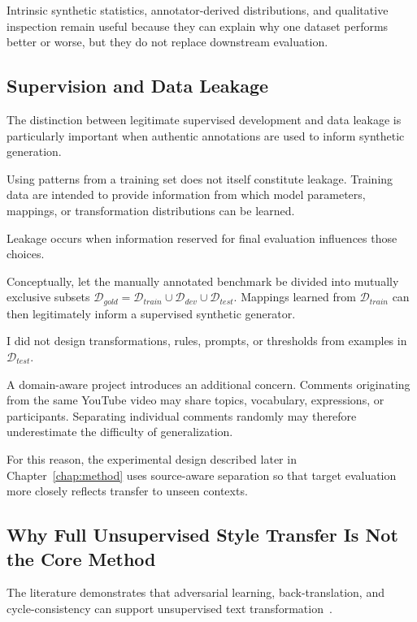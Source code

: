 \documentclass[12pt, a4paper, twoside, openany]{report}
\begin{document}
Intrinsic synthetic statistics, annotator-derived distributions, and qualitative inspection remain useful because they can explain why one dataset performs better or worse, but they do not replace downstream evaluation.


\subsection{Supervision and Data Leakage}

The distinction between legitimate supervised development and data leakage is particularly important when authentic annotations are used to inform synthetic generation.

Using patterns from a training set does not itself constitute leakage. Training data are intended to provide information from which model parameters, mappings, or transformation distributions can be learned.

Leakage occurs when information reserved for final evaluation influences those choices.

Conceptually, let the manually annotated benchmark be divided into mutually exclusive subsets $\mathcal{D}_{gold}=\mathcal{D}_{train}\cup\mathcal{D}_{dev}\cup\mathcal{D}_{test}$. Mappings learned from $\mathcal{D}_{train}$ can then legitimately inform a supervised synthetic generator.

I did not design transformations, rules, prompts, or thresholds from examples in $\mathcal{D}_{test}$.

A domain-aware project introduces an additional concern. Comments originating from the same YouTube video may share topics, vocabulary, expressions, or participants. Separating individual comments randomly may therefore underestimate the difficulty of generalization.

For this reason, the experimental design described later in Chapter~\ref{chap:method} uses source-aware separation so that target evaluation more closely reflects transfer to unseen contexts.


\subsection{Why Full Unsupervised Style Transfer Is Not the Core Method}

The literature demonstrates that adversarial learning, back-translation, and cycle-consistency can support unsupervised text transformation~\cite{he2020probabilistic,zhang2018styletransfer,li2020codeswitching}.
\end{document}
